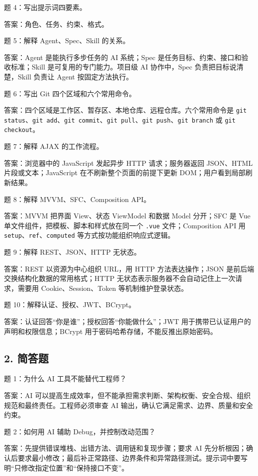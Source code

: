 \documentclass[UTF8,zihao=-4]{ctexart}
\begin{document}
题 4：写出提示词四要素。

答案：角色、任务、约束、格式。

题 5：解释 Agent、Spec、Skill 的关系。

答案：Agent 是能执行多步任务的 AI 系统；Spec 是任务目标、约束、接口和验收标准；Skill 是可复用的专门能力。项目级 AI 协作中，Spec 负责把目标说清楚，Skill 负责让 Agent 按固定方法执行。

题 6：写出 Git 四个区域和六个常用命令。

答案：四个区域是工作区、暂存区、本地仓库、远程仓库。六个常用命令是 \texttt{git status}、\texttt{git add}、\texttt{git commit}、\texttt{git pull}、\texttt{git push}、\texttt{git branch} 或 \texttt{git checkout}。

题 7：解释 AJAX 的工作流程。

答案：浏览器中的 JavaScript 发起异步 HTTP 请求；服务器返回 JSON、HTML 片段或文本；JavaScript 在不刷新整个页面的前提下更新 DOM；用户看到局部刷新结果。

题 8：解释 MVVM、SFC、Composition API。

答案：MVVM 把界面 View、状态 ViewModel 和数据 Model 分开；SFC 是 Vue 单文件组件，把模板、脚本和样式放在同一个 \texttt{.vue} 文件；Composition API 用 \texttt{setup}、\texttt{ref}、\texttt{computed} 等方式按功能组织响应式逻辑。

题 9：解释 REST、JSON、HTTP 无状态。

答案：REST 以资源为中心组织 URL，用 HTTP 方法表达操作；JSON 是前后端交换结构化数据的常用格式；HTTP 无状态表示服务器不会自动记住上一次请求，需要用 Cookie、Session、Token 等机制维护登录状态。

题 10：解释认证、授权、JWT、BCrypt。

答案：认证回答“你是谁”；授权回答“你能做什么”；JWT 用于携带已认证用户的声明和权限信息；BCrypt 用于密码哈希存储，不能反推出原始密码。

\subsection{2. 简答题}

题 1：为什么 AI 工具不能替代工程师？

答案：AI 可以提高生成效率，但不能承担需求判断、架构权衡、安全合规、组织规范和最终责任。工程师必须审查 AI 输出，确认它满足需求、边界、质量和安全约束。

题 2：如何用 AI 辅助 Debug，并控制改动范围？

答案：先提供错误堆栈、出错方法、调用链和复现步骤；要求 AI 先分析根因；确认后要求最小修改；最后补正常路径、边界条件和异常路径测试。提示词中要写明“只修改指定位置”和“保持接口不变”。
\end{document}
